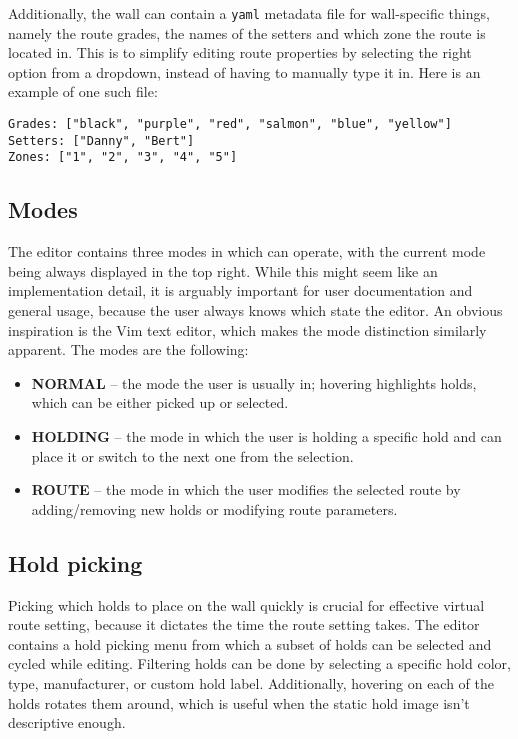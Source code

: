 Additionally, the wall can contain a \verb|yaml| metadata file for wall-specific things, namely the route grades, the names of the setters and which zone the route is located in.
This is to simplify editing route properties by selecting the right option from a dropdown, instead of having to manually type it in. Here is an example of one such file:

\begin{verbatim}
Grades: ["black", "purple", "red", "salmon", "blue", "yellow"]
Setters: ["Danny", "Bert"]
Zones: ["1", "2", "3", "4", "5"]
\end{verbatim}

\subsection{Modes}
The editor contains three modes in which can operate, with the current mode being always displayed in the top right.
While this might seem like an implementation detail, it is arguably important for user documentation and general usage, because the user always knows which state the editor.
An obvious inspiration is the Vim text editor, which makes the mode distinction similarly apparent.
The modes are the following:

\begin{itemize}
		\item \textbf{NORMAL} -- the mode the user is usually in; hovering highlights holds, which can be either picked up or selected.
		\item \textbf{HOLDING} -- the mode in which the user is holding a specific hold and can place it or switch to the next one from the selection.
		\item \textbf{ROUTE} -- the mode in which the user modifies the selected route by adding/removing new holds or modifying route parameters.
\end{itemize}

\subsection{Hold picking}
Picking which holds to place on the wall quickly is crucial for effective virtual route setting, because it dictates the time the route setting takes.
The editor contains a hold picking menu from which a subset of holds can be selected and cycled while editing.
Filtering holds can be done by selecting a specific hold color, type, manufacturer, or custom hold label.
Additionally, hovering on each of the holds rotates them around, which is useful when the static hold image isn't descriptive enough.

